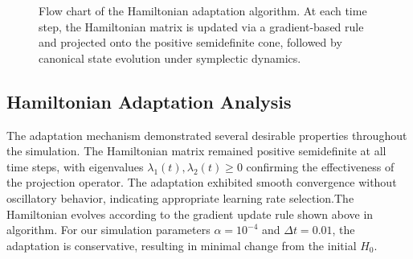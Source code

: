 \documentclass[reqno]{amsart}
\numberwithin{equation}{section}
\begin{document}
\begin{figure}[t]
\centering
{}
\caption{Flow chart of the Hamiltonian adaptation algorithm. At each time step, the Hamiltonian matrix is updated via a gradient-based rule and projected onto the positive semidefinite cone, followed by canonical state evolution under symplectic dynamics.}
\label{fig:hamiltonian_flowchart}
\end{figure}



\subsection*{Hamiltonian Adaptation Analysis}

The adaptation mechanism demonstrated several desirable properties throughout the simulation. The Hamiltonian matrix remained positive semidefinite at all time steps, with eigenvalues $\lambda_1(t), \lambda_2(t) \geq 0$ confirming the effectiveness of the projection operator. The adaptation exhibited smooth convergence without oscillatory behavior, indicating appropriate learning rate selection.The Hamiltonian evolves according to the gradient update rule shown above in algorithm. For our simulation parameters $\alpha = 10^{-4}$ and $\Delta t = 0.01$, 
the adaptation is conservative, resulting in minimal change from the initial $H_0$.\\ 
\end{document}
